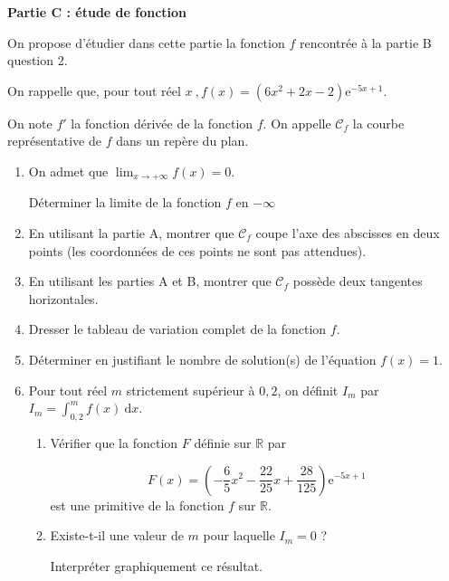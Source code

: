 \documentclass[10pt]{article}
\providecommand{\R}{\mathbb{R}}
\providecommand{\e}{{\mathrm{e}}}
\begin{document}
\medskip

\textbf{Partie C : étude de fonction}

\medskip

On propose d'étudier dans cette partie la fonction $f$ rencontrée à la partie B question 2. 

On rappelle que, pour tout réel $x\:, f(x) = \left(6x^2 + 2x - 2\right)\e^{-5x+ 1}$.

On note $f'$ la fonction dérivée de la fonction $f$. On appelle $\mathcal{C}_f$ la courbe représentative de $f$ dans un repère du plan.

\medskip

\begin{enumerate}
\item On admet que $\displaystyle\lim_{x \to + \infty} f(x) = 0$.

Déterminer la limite de la fonction $f$ en $- \infty$
\item En utilisant la partie A, montrer que $\mathcal{C}_f$ coupe l'axe des abscisses en deux points (les coordonnées de ces points ne sont pas attendues).
\item En utilisant les parties A et B, montrer que $\mathcal{C}_f$ possède deux tangentes horizontales.
\item Dresser le tableau de variation complet de la fonction $f$.
\item Déterminer en justifiant le nombre de solution(s) de l'équation $f(x)= 1$.
\item Pour tout réel $m$ strictement supérieur à $0,2$, on définit $I_m$ par $I_m = \displaystyle\int_{0,2}^m f(x)\:\text{d}x$.
	\begin{enumerate}
		\item Vérifier que la fonction $F$ définie sur $\R$ par

\[F(x) = \left(-\dfrac65 x^2 - \dfrac{22}{25}x + \dfrac{28}{125}\right)\e^{-5x+ 1}\]
est une primitive de la fonction $f$ sur $\R$.
		\item Existe-t-il une valeur de $m$ pour laquelle $I_m = 0$ ? 

Interpréter graphiquement ce résultat.
	\end{enumerate}
\end{enumerate}
\end{document}

